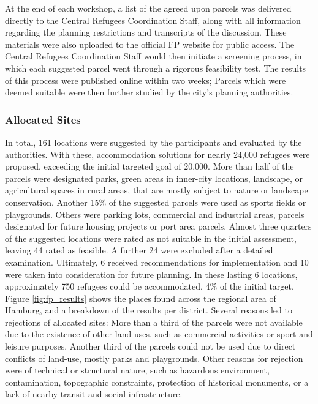{{        At the end of each workshop, a list of the agreed upon parcels was delivered directly to the Central Refugees Coordination Staff, along with all information regarding the planning restrictions and transcripts of the discussion. These materials were also uploaded to the official FP website for public access. The Central Refugees Coordination Staff would then initiate a screening process, in which each suggested parcel went through a rigorous feasibility test. The results of this process were published online within two weeks; Parcels which were deemed suitable were then further studied by the city's planning authorities.

        \subsubsection{Allocated Sites}
        {
            In total, 161 locations were suggested by the participants and evaluated by the authorities. With these, accommodation solutions for nearly 24,000 refugees were proposed, exceeding the initial targeted goal of 20,000. More than half of the parcels were designated parks, green areas in inner-city locations, landscape, or agricultural spaces in rural areas, that are mostly subject to nature or landscape conservation. Another 15\% of the suggested parcels were used as sports fields or playgrounds. Others were parking lots, commercial and industrial areas, parcels designated for future housing projects or port area parcels. Almost three quarters of the suggested locations were rated as not suitable in the initial assessment, leaving 44 rated as feasible. A further 24 were excluded after a detailed examination. Ultimately, 6 received recommendations for implementation and 10 were taken into consideration for future planning. In these lasting 6 locations, approximately 750 refugees could be accommodated, 4\% of the initial target. Figure \eqref{fig:fp_results} shows the places found across the regional area of Hamburg, and a breakdown of the results per district.
            \newline
            Several reasons led to rejections of allocated sites: More than a third of the parcels were not available due to the existence of other land-uses, such as commercial activities or sport and leisure purposes. Another third of the parcels could not be used due to direct conflicts of land-use, mostly parks and playgrounds. Other reasons for rejection were of technical or structural nature, such as hazardous environment, contamination, topographic constraints, protection of historical monuments, or a lack of nearby transit and social infrastructure.
        }

}}
